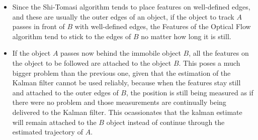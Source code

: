 \begin{itemize}
\item Since the Shi-Tomasi algorithm tends to place features on well-defined edges, and these are usually the outer edges of an object, if the object to track $A$ passes in front of $B$ with well-defined edges, the Features of the Optical Flow algorithm tend to stick to the edges of $B$ no matter how long it is still.

\item If the object $A$ passes now behind the immobile object $B$, all the features on the object to be followed are attached to the object $B$. This poses a much bigger problem than the previous one, given that the estimation of the Kalman filter cannot be used reliably, because when the features stay still and attached to the outer edges of $B$, the position is still being measured as if there were no problem and those measurements are continually being delivered to the Kalman filter. This ocassionates that the kalman estimate will remain attached to the $B$ object instead of continue through the estimated trajectory of $A$.

\end{itemize}




























